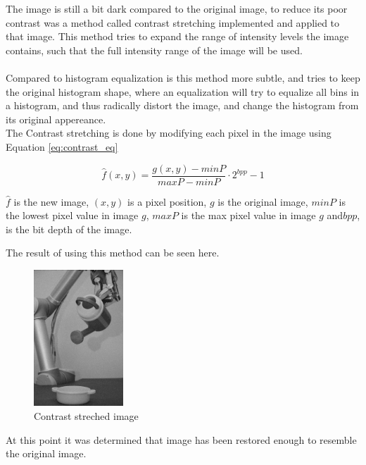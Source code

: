 The image is still a bit dark compared to the original image, to reduce its poor contrast was a method called contrast stretching implemented and applied to that image.  This method tries to expand the range of intensity levels the image contains, such that the full intensity range of the image will be used. \\
\\

Compared to histogram equalization is this method more subtle, and tries to keep the original histogram shape, where an equalization  will try to equalize all bins in a histogram, and thus radically distort the image, and change the histogram from its original appereance.\\



The Contrast stretching is  done by modifying each pixel in the image using Equation \ref{eq:contrast_eq}

\begin{equation}
\hat{f}(x,y) = \frac{g(x,y) - minP}{maxP - minP} \cdot 2^{bpp }-1
\label{eq:contrast_eq}
\end{equation}
  
$\hat{f}$ is the new image,  $(x,y)$ is  a pixel position, $g$ is the original image, $minP$ is the lowest pixel value in image $g$, $maxP$ is the max pixel value in image $g$ and$ bpp$, is the bit depth of the image. 

The result of using this method can be seen here. 

\begin{figure}[H]
\centering
 \includegraphics[width=0.30\textwidth]{img1/img_1_gaus_5_1_constrast_strech.png}
        \caption{Contrast streched image}
         \label{fig:img1_contra11_1}
\end{figure}

At this point it was determined that image has been restored enough to resemble the original image. 

